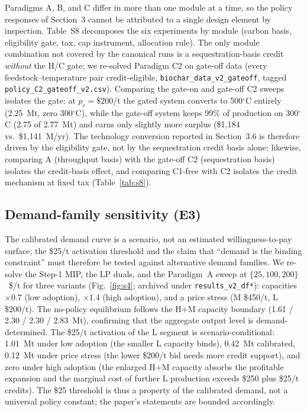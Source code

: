 Paradigms A, B, and C differ in more than one module at a time, so the policy
responses of Section~3 cannot be attributed to a single design element by
inspection. Table~S8 decomposes the six experiments by module (carbon basis,
eligibility gate, tax, cap instrument, allocation rule). The only module
combination not covered by the canonical runs is a sequestration-basis credit
\emph{without} the H/C gate; we re-solved Paradigm C2 on gate-off data
(every feedstock--temperature pair credit-eligible,
\texttt{biochar\_data\_v2\_gateoff}, tagged \texttt{policy\_C2\_gateoff\_v2.csv}).
Comparing the gate-on and gate-off C2 sweeps isolates the gate: at
$p_c=\$200$/t the gated system converts to 500$^\circ$C entirely (2.25~Mt,
zero 300$^\circ$C), while the gate-off system keeps 99\% of production on
300$^\circ$C (2.75 of 2.77~Mt) and earns only slightly more surplus
(\$1{,}184 vs.\ \$1{,}141~M/yr). The technology conversion reported in
Section~3.6 is therefore driven by the eligibility gate, not by the
sequestration credit basis alone; likewise, comparing A (throughput basis) with
the gate-off C2 (sequestration basis) isolates the credit-basis effect, and
comparing C1-free with C2 isolates the credit mechanism at fixed tax
(Table~\ref{tab:s8}).

\subsection{Demand-family sensitivity (E3)}

The calibrated demand curve is a scenario, not an estimated willingness-to-pay
surface; the \$25/t activation threshold and the claim that ``demand is the
binding constraint'' must therefore be tested against alternative demand
families. We re-solve the Step-1 MIP, the LP duals, and the Paradigm~A sweep
at $\{25, 100, 200\}$~\$/t for three variants (Fig.~\ref{fig:s4}; archived
under \texttt{results\_v2\_df*}): capacities $\times$0.7 (low adoption),
$\times$1.4 (high adoption), and a price stress (M \$450/t, L \$200/t). The
no-policy equilibrium follows the H+M capacity boundary (1.61 / 2.30 / 2.30 /
2.83~Mt), confirming that the aggregate output level is demand-determined. The
\$25/t activation of the L segment is scenario-conditional: 1.01~Mt under low
adoption (the smaller L capacity binds), 0.42~Mt calibrated, 0.12~Mt under
price stress (the lower \$200/t bid needs more credit support), and zero under
high adoption (the enlarged H+M capacity absorbs the profitable expansion and
the marginal cost of further L production exceeds \$250 plus \$25/t credits).
The \$25 threshold is thus a property of the calibrated demand, not a
universal policy constant; the paper's statements are bounded accordingly.

